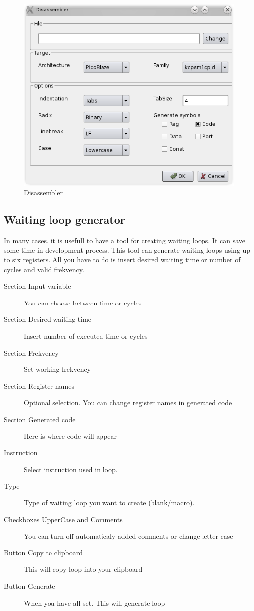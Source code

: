     \begin{figure}[h]
        \centering{}
        \includegraphics[width=.5\textwidth]{img/disassembler_window.png}
        \caption{Disassembler}
    \end{figure}

\subsection{Waiting loop generator}
    In many cases, it is usefull to have a tool for creating waiting loops. It can save some time in development process. This tool can generate
    waiting loops using up to six registers. All you have to do is insert desired waiting time or number of cycles and valid frekvency.

    \begin{description}
        \item[Section Input variable] You can choose between time or cycles
        \item[Section Desired waiting time] Insert number of executed time or cycles 
        \item[Section Frekvency] Set working frekvency 
        \item[Section Register names] Optional selection. You can change register names in generated code
        \item[Section Generated code] Here is where code will appear
        \item[Instruction] Select instruction used in loop.
        \item[Type] Type of waiting loop you want to create (blank/macro).
        \item[Checkboxes UpperCase and Comments]  You can turn off automaticaly added comments or change letter case
        \item[Button Copy to clipboard] This will copy loop into your clipboard
        \item[Button Generate] When you have all set. This will generate loop
    \end{description}

